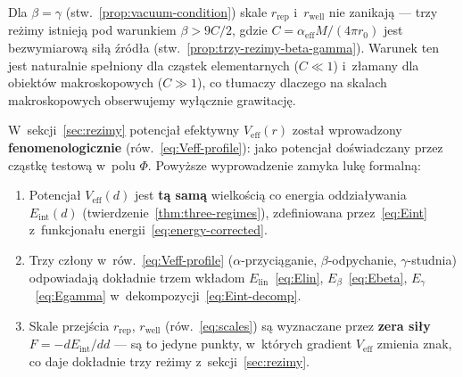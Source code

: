 \begin{remark}%
\label{rem:trzy-rezimy-vacuum}
Dla $\beta = \gamma$ (stw.~\ref{prop:vacuum-condition}) skale
$r_{\mathrm{rep}}$ i~$r_{\mathrm{well}}$ nie zanikaj\k{a} ---
trzy re\.zimy istniej\k{a} pod warunkiem $\beta > 9C/2$,
gdzie $C = \alpha_{\mathrm{eff}} M/(4\pi r_0)$ jest
bezwymiarow\k{a} si\l{}\k{a} \'zr\'od\l{}a
(stw.~\ref{prop:trzy-rezimy-beta-gamma}).
Warunek ten jest naturalnie spe\l{}niony dla cz\k{a}stek
elementarnych ($C \ll 1$) i~z\l{}amany dla obiekt\'ow
makroskopowych ($C \gg 1$), co t\l{}umaczy dlaczego
na skalach makroskopowych obserwujemy wy\l{}\k{a}cznie grawitacj\k{e}.
\end{remark}

\begin{remark}\label{rem:Veff-Eint-bridge}
W~sekcji~\ref{sec:rezimy} potencja\l{} efektywny $V_{\mathrm{eff}}(r)$
zosta\l{} wprowadzony \textbf{fenomenologicznie}
(r\'ow.~\ref{eq:Veff-profile}): jako potencja\l{} do\'swiadczany
przez cz\k{a}stk\k{e} testow\k{a} w~polu $\Phi$.
Powy\.zsze wyprowadzenie zamyka luk\k{e} formaln\k{a}:

\begin{enumerate}[nosep]
  \item Potencja\l{} $V_{\mathrm{eff}}(d)$ jest
    \textbf{t\k{a} sam\k{a}} wielko\'sci\k{a} co energia
    oddzia\l{}ywania $E_{\mathrm{int}}(d)$
    (twierdzenie~\ref{thm:three-regimes}), zdefiniowana
    przez~\eqref{eq:Eint} z~funkcjona\l{}u energii~\eqref{eq:energy-corrected}.
  \item Trzy cz\l{}ony w~r\'ow.~\eqref{eq:Veff-profile}
    ($\alpha$-przyci\k{a}ganie, $\beta$-odpychanie, $\gamma$-studnia)
    odpowiadaj\k{a} dok\l{}adnie trzem wk\l{}adom
    $E_{\mathrm{lin}}$~\eqref{eq:Elin},
    $E_\beta$~\eqref{eq:Ebeta},
    $E_\gamma$~\eqref{eq:Egamma}
    w~dekompozycji~\eqref{eq:Eint-decomp}.
  \item Skale przej\'scia $r_{\mathrm{rep}}$, $r_{\mathrm{well}}$
    (r\'ow.~\eqref{eq:scales}) s\k{a} wyznaczane przez
    \textbf{zera si\l{}y} $F = -dE_{\mathrm{int}}/dd$ ---
    s\k{a} to jedyne punkty, w~kt\'orych gradient $V_{\mathrm{eff}}$
    zmienia znak, co daje dok\l{}adnie trzy re\.zimy
    z~sekcji~\ref{sec:rezimy}.
\end{enumerate}
\end{remark}

